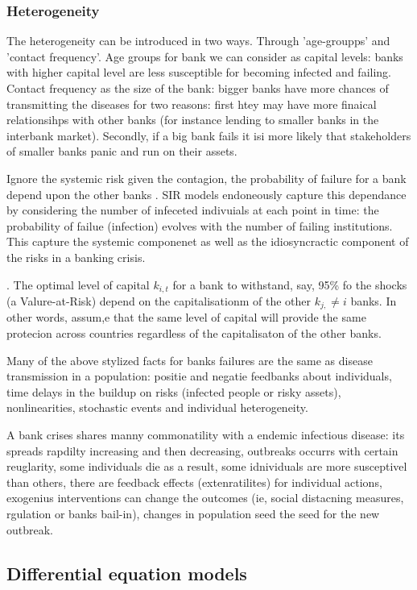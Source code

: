 \documentclass[11pt,final]{article}%
\begin{document}
\subsubsection{Heterogeneity}
The heterogeneity can be introduced in two ways. Through 'age-groupps' and 'contact frequency'. Age groups for bank we can consider as capital levels: banks with higher capital level are less susceptible for becoming infected and failing. Contact frequency as the size of the bank: bigger banks have more chances of transmitting the diseases for two reasons: first htey may have more finaical relationsihps with other banks (for instance lending to smaller banks in the interbank market). Secondly, if a big bank fails it isi more likely that stakeholders of smaller banks panic and run on their assets. 

Ignore the systemic risk
given the contagion, the probability of failure for a bank depend upon the other banks . SIR models endoneously capture this dependance by considering the number of infeceted indivuials at each point in time: the probability of failue (infection) evolves with the number of failing institutions. This capture the systemic componenet as well as the idiosyncractic component of the risks in a banking crisis. 

.
 The optimal level of capital $k_{i, t}$ for a bank to withstand, say, 95\% fo the shocks (a Valure-at-Risk) depend on the capitalisationm of the other $k_{j,} \neq i$ banks. In other words, assum,e that the same level of capital will provide the same protecion across countries regardless of the capitalisaton of the other banks. 



Many of the above stylized facts for banks failures are the same as disease transmission in a population: positie and negatie feedbanks about individuals, time delays in the buildup on risks (infected people or risky assets), nonlinearities, stochastic events and individual heterogeneity.

A bank crises shares manny commonatility with a endemic infectious disease: its spreads rapdilty increasing and then decreasing, outbreaks occurrs with certain reuglarity, some individuals die as a result, some idnividuals are more susceptivel than others, there are feedback effects (extenratilites) for individual actions, exogenius interventions can change the outcomes (ie, social distacning measures, rgulation or banks bail-in), changes in population seed the seed for the new outbreak. 
\subsection{Differential equation models}
\end{document}
